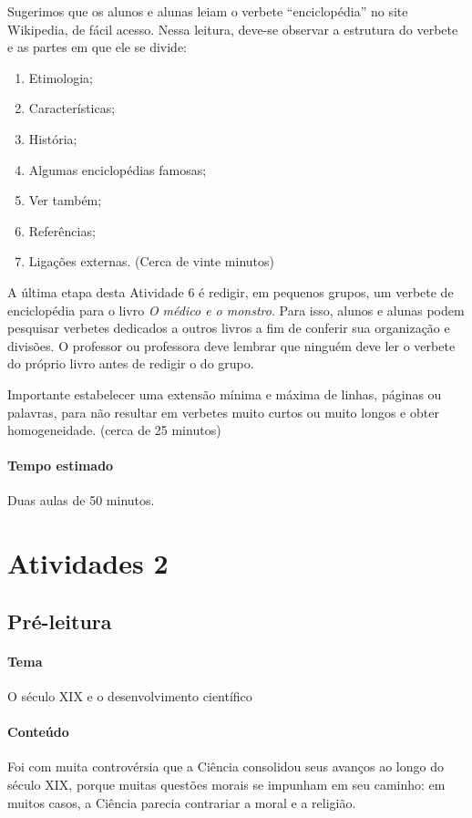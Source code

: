 \documentclass[12pt]{extarticle}
\begin{document}
Sugerimos que os alunos e alunas leiam o verbete ``enciclopédia'' no
site Wikipedia, de fácil acesso. Nessa leitura, deve-se observar a
estrutura do verbete e as partes em que ele se divide:
\begin{enumerate}
\item
Etimologia;
\item
Características;
\item
História;
\item
Algumas enciclopédias famosas;
\item 
Ver também;
\item
Referências;
\item
Ligações externas. (Cerca de vinte minutos)
\end{enumerate}

A última etapa desta Atividade 6 é redigir, em pequenos grupos, um
verbete de enciclopédia para o livro \emph{O médico e o monstro}. Para
isso, alunos e alunas podem pesquisar verbetes dedicados a outros livros
a fim de conferir sua organização e divisões. O professor ou professora
deve lembrar que ninguém deve ler o verbete do próprio livro antes de
redigir o do grupo.

Importante estabelecer uma extensão mínima e máxima de linhas, páginas
ou palavras, para não resultar em verbetes muito curtos ou muito longos
e obter homogeneidade. (cerca de 25 minutos)

\paragraph{Tempo estimado} Duas aulas de 50 minutos.

\section{Atividades 2}

\subsection{Pré-leitura}

\paragraph{Tema} O século XIX e o desenvolvimento científico


\paragraph{Conteúdo}
Foi com muita controvérsia que a Ciência consolidou seus avanços ao
longo do século XIX, porque muitas questões morais se impunham em seu
caminho: em muitos casos, a Ciência parecia contrariar a moral e a
religião.
\end{document}
